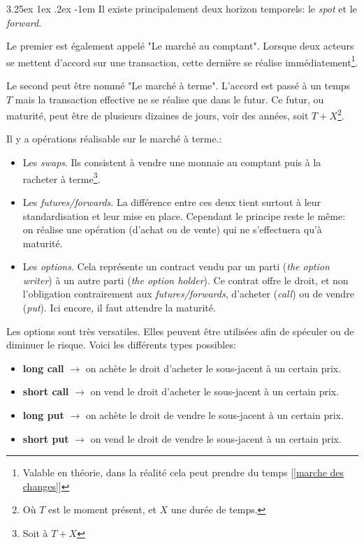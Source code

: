 \documentclass[a4paper, 11pt]{article}
\makeatletter
\renewcommand\paragraph{\@startsection{paragraph}{5}{\z@}%
  {3.25ex \@plus1ex \@minus.2ex}%
  {-1em}%
  {\normalfont\normalsize\bfseries}}
\makeatother
\begin{document}
\paragraph{}
Il existe principalement deux horizon temporels: le \textit{spot} et le \textit{forward}.

Le premier est également appelé "Le marché au comptant". Lorsque deux acteurs se mettent d'accord sur une transaction, cette dernière se réalise immédiatement\footnote{Valable en théorie, dans la réalité cela peut prendre du temps [\ref{marche des changes}]}.

Le second peut être nommé "Le marché à terme". L'accord est passé à un temps $T$ mais la transaction effective ne se réalise que dans le futur. Ce futur, ou maturité, peut être de plusieurs dizaines de jours, voir des années, soit $T + X$\footnote{Où $T$ est le moment présent, et $X$ une durée de temps.}.

Il y a opérations réalisable sur le marché à terme.:
\begin{itemize}
\item Les \textit{swaps}. Ils consistent à vendre une monnaie au comptant puis à la racheter à terme\footnote{Soit à $T+X$}.
\item Les \textit{futures/forwards}. La différence entre ces deux tient surtout à leur standardisation et leur mise en place. Cependant le principe reste le même: on réalise une opération (d'achat ou de vente) qui ne s'effectuera qu'à maturité.
\item Les \textit{options}. Cela représente un contract vendu par un parti (\textit{the option writer}) à un autre parti (\textit{the option holder}). Ce contrat offre le droit, et non l'obligation contrairement aux \textit{futures/forwards}, d'acheter (\textit{call}) ou de vendre (\textit{put}). Ici encore, il faut attendre la maturité.
\end{itemize}

Les options sont très versatiles. Elles peuvent être utilisées afin de spéculer ou de diminuer le risque. Voici les différents types possibles:
\begin{itemize}
\item \textbf{long call} $\rightarrow$ on achète le droit d'acheter le sous-jacent à un certain prix.
\item \textbf{short call} $\rightarrow$ on vend le droit d'acheter le sous-jacent à un certain prix.
\item \textbf{long put} $\rightarrow$ on achète le droit de vendre le sous-jacent à un certain prix.
\item \textbf{short put} $\rightarrow$ on vend le droit de vendre le sous-jacent à un certain prix.
\end{itemize}
\end{document}
